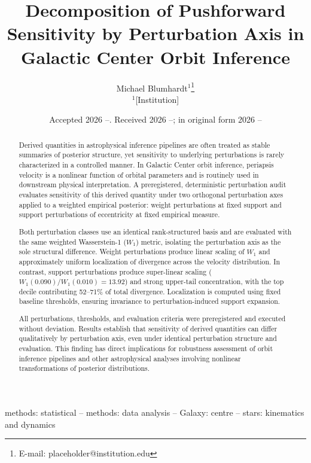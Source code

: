 \documentclass[a4paper,fleqn,usenatbib]{mnras}
\title[Pushforward Sensitivity by Perturbation Axis]{%
  Decomposition of Pushforward Sensitivity by Perturbation Axis
  in Galactic Center Orbit Inference}
\author[M. Blumhardt]{%
  Michael Blumhardt$^{1}$\thanks{E-mail: placeholder@institution.edu}
  \\
  $^{1}$[Institution]
}
\date{Accepted 2026 --. Received 2026 --; in original form 2026 --}
\begin{document}
\label{firstpage}
\pagerange{\pageref{firstpage}--\pageref{lastpage}}
\maketitle

\begin{abstract}
Derived quantities in astrophysical inference pipelines are often treated as
stable summaries of posterior structure, yet sensitivity to underlying
perturbations is rarely characterized in a controlled manner. In Galactic
Center orbit inference, periapsis velocity is a nonlinear function of orbital
parameters and is routinely used in downstream physical interpretation. A
preregistered, deterministic perturbation audit evaluates sensitivity of this
derived quantity under two orthogonal perturbation axes applied to a weighted
empirical posterior: weight perturbations at fixed support and support
perturbations of eccentricity at fixed empirical measure.

Both perturbation classes use an identical rank-structured basis and are
evaluated with the same weighted Wasserstein-1 ($W_1$) metric, isolating the
perturbation axis as the sole structural difference. Weight perturbations
produce linear scaling of $W_1$ and approximately uniform localization of
divergence across the velocity distribution. In contrast, support perturbations
produce super-linear scaling ($W_1(0.090)/W_1(0.010) = 13.92$) and strong
upper-tail concentration, with the top decile contributing 52--71\% of total
divergence. Localization is computed using fixed baseline thresholds, ensuring
invariance to perturbation-induced support expansion.

All perturbations, thresholds, and evaluation criteria were preregistered and
executed without deviation. Results establish that sensitivity of derived
quantities can differ qualitatively by perturbation axis, even under identical
perturbation structure and evaluation. This finding has direct
implications for robustness assessment of orbit inference pipelines and other
astrophysical analyses involving nonlinear transformations of posterior
distributions.
\end{abstract}

\begin{keywords}
methods: statistical -- methods: data analysis -- Galaxy: centre --
stars: kinematics and dynamics
\end{keywords}
\end{document}
